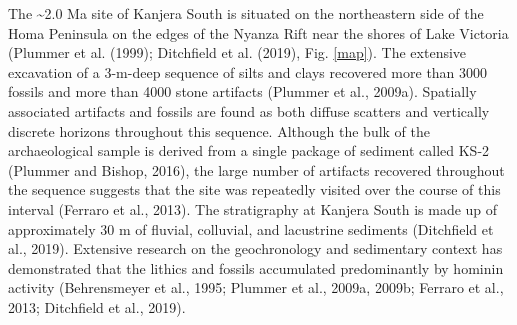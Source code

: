 \documentclass[]{elsarticle} %
\begin{document}
The \textasciitilde2.0 Ma site of Kanjera South is situated on the
northeastern side of the Homa Peninsula on the edges of the Nyanza Rift
near the shores of Lake Victoria (Plummer et al. (1999); Ditchfield et
al. (2019), Fig. \ref{map}). The extensive excavation of a 3-m-deep
sequence of silts and clays recovered more than 3000 fossils and more
than 4000 stone artifacts (\hspace{0pt}Plummer et al.,
2009a\hspace{0pt}). Spatially associated artifacts and fossils are found
as both diffuse scatters and vertically discrete horizons throughout
this sequence. Although the bulk of the archaeological sample is derived
from a single package of sediment called KS-2 (\hspace{0pt}Plummer and
Bishop, 2016\hspace{0pt}), the large number of artifacts recovered
throughout the sequence suggests that the site was repeatedly visited
over the course of this interval (\hspace{0pt}Ferraro et al.,
2013\hspace{0pt}). The stratigraphy at Kanjera South is made up of
approximately 30 m of fluvial, colluvial, and lacustrine sediments
(\hspace{0pt}Ditchfield et al., 2019\hspace{0pt}). Extensive research on
the geochronology and sedimentary context has demonstrated that the
lithics and fossils accumulated predominantly by hominin activity
(\hspace{0pt}Behrensmeyer et al., 1995\hspace{0pt}; \hspace{0pt}Plummer
et al., 2009a\hspace{0pt}, \hspace{0pt}2009b\hspace{0pt};
\hspace{0pt}Ferraro et al., 2013\hspace{0pt}; \hspace{0pt}Ditchfield et
al., 2019\hspace{0pt}).
\end{document}
